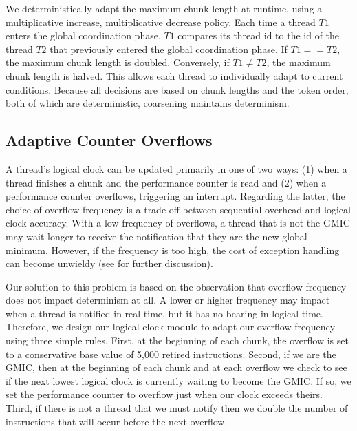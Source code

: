 We deterministically adapt the maximum chunk length at runtime, using a multiplicative increase, multiplicative decrease policy. 
Each time a thread $T1$ enters the global coordination phase, $T1$ compares its thread id to the id of the thread $T2$ that previously entered the global coordination phase.
If $T1==T2$, the maximum chunk length is doubled. Conversely, if $T1\neq{}T2$, the maximum chunk length is halved. 
This allows each thread to individually adapt to current conditions.
Because all decisions are based on chunk lengths and the token order, both of which are deterministic, coarsening maintains determinism.

\subsection{Adaptive Counter Overflows}

A thread's logical clock can be updated primarily in one of two ways: (1) when a thread finishes a chunk and the performance counter is read and (2) when a performance counter overflows, triggering an interrupt. Regarding the latter, the choice of overflow frequency is a trade-off between sequential overhead and logical clock accuracy. With a low frequency of overflows, a thread that is not the GMIC may wait longer to receive the notification that they are the new global minimum. However, if the frequency is too high, the cost of exception handling can become unwieldy (see \cite{olszewski_kendo:_2009} for further discussion). 

Our solution to this problem is based on the observation that overflow frequency does not impact determinism at all. A lower or higher frequency may impact when a thread is notified in real time, but it has no bearing in logical time. Therefore,  we design our logical clock module to adapt our overflow frequency using three simple rules. First, at the beginning of each chunk, the overflow is set to a conservative base value of 5,000 retired instructions. Second, if we are the GMIC, then at the beginning of each chunk and at each overflow we check to see if the next lowest logical clock is currently waiting to become the GMIC. If so, we set the performance counter to overflow just when our clock exceeds theirs. Third, if there is not a thread that we must notify then we double the number of instructions that will occur before the next overflow. 


